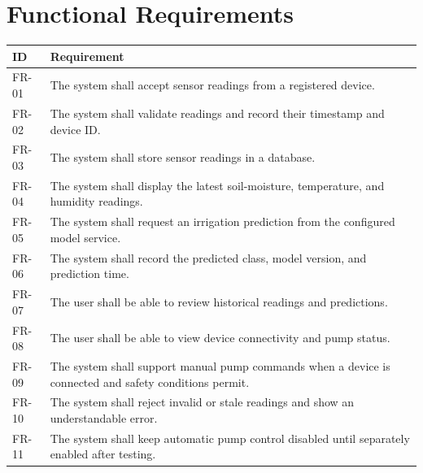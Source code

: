 \documentclass[12pt,a4paper]{report}
\begin{document}
\section{Functional Requirements}
\begin{longtable}{p{}p{}}
\toprule
\textbf{ID} & \textbf{Requirement}\\
\midrule
FR-01 & The system shall accept sensor readings from a registered device.\\
FR-02 & The system shall validate readings and record their timestamp and device ID.\\
FR-03 & The system shall store sensor readings in a database.\\
FR-04 & The system shall display the latest soil-moisture, temperature, and humidity readings.\\
FR-05 & The system shall request an irrigation prediction from the configured model service.\\
FR-06 & The system shall record the predicted class, model version, and prediction time.\\
FR-07 & The user shall be able to review historical readings and predictions.\\
FR-08 & The user shall be able to view device connectivity and pump status.\\
FR-09 & The system shall support manual pump commands when a device is connected and safety conditions permit.\\
FR-10 & The system shall reject invalid or stale readings and show an understandable error.\\
FR-11 & The system shall keep automatic pump control disabled until separately enabled after testing.\\
\bottomrule
\end{longtable}
\end{document}
